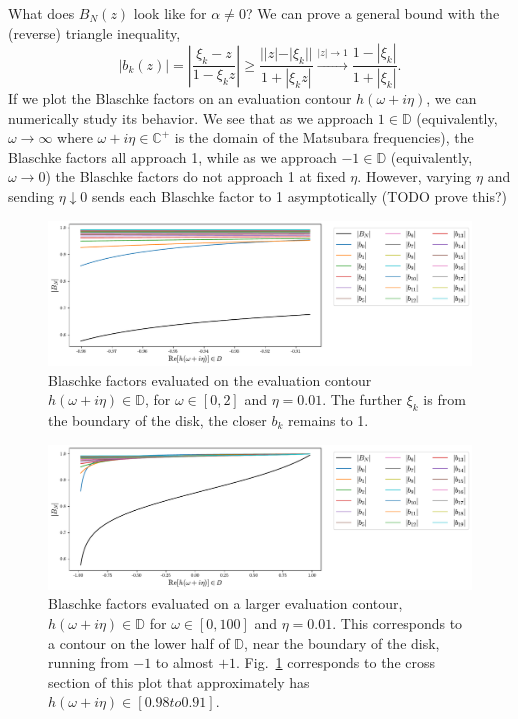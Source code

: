\begin{appendices}
What does $B_N(z)$ look like for $\alpha\neq 0$? We can prove a general bound with the (reverse) triangle inequality,
\begin{equation}
    |b_k(z)| = \left| \frac{\xi_k - z}{1 - \xi_k z} \right| \geq \frac{||z| - |\xi_k||}{1 + |\xi_k z|} \xrightarrow{|z|\rightarrow 1} \frac{1 - |\xi_k|}{1  + |\xi_k|}. 
\end{equation}
If we plot the Blaschke factors on an evaluation contour $h(\omega + i\eta)$, we can numerically study its behavior. We see that as we approach $1\in\mathbb D$ (equivalently, $\omega\rightarrow\infty$ where $\omega + i\eta\in\mathbb C^+$ is the domain of the Matsubara frequencies), the Blaschke factors all approach 1, while as we approach $-1\in\mathbb D$ (equivalently, $\omega\rightarrow 0$) the Blaschke factors do not approach 1 at fixed $\eta$. However, varying $\eta$ and sending $\eta\downarrow 0$  sends each Blaschke factor to 1 asymptotically ({\color{red}TODO prove this?})

\begin{figure}[!htp]
    \centering
    \includegraphics[width = \textwidth]{figs/blashke_eval_axis.pdf}
    \caption{Blaschke factors evaluated on the evaluation contour $h(\omega + i\eta)\in\mathbb D$, for $\omega\in [0, 2]$ and $\eta = 0.01$. The further $\xi_k$ is from the boundary of the disk, the closer $b_k$ remains to 1.}
    \label{fig:blaschke_eval_axis}
\end{figure}

\begin{figure}[!htp]
    \centering
    \includegraphics[width = \textwidth]{figs/blashke_eval_axis_full.pdf}
    \caption{Blaschke factors evaluated on a larger evaluation contour, $h(\omega + i\eta)\in\mathbb D$ for $\omega\in [0, 100]$ and $\eta = 0.01$. This corresponds to a contour on the lower half of $\mathbb D$, near the boundary of the disk, running from $-1$ to almost $+1$. Fig.~\ref{fig:blaschke_eval_axis} corresponds to the cross section of this plot that approximately has $h(\omega + i\eta)\in [0.98 to 0.91]$.}
    \label{fig:blaschke_eval_axis_full}
\end{figure}

\end{appendices}

